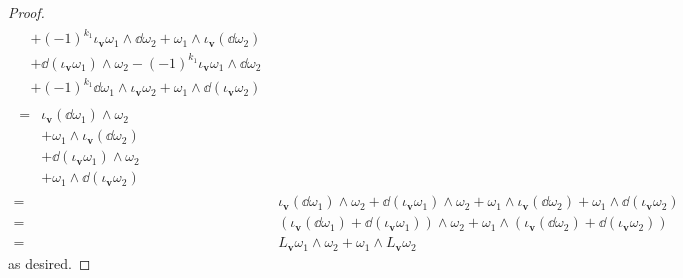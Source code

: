 \documentclass[../psets.tex]{subfiles}
\begin{document}
\begin{enumerate}[label={\textbf{2.5.\roman*.}}]
\begin{proof}
\begin{align*}
\begin{split}
                &+(-1)^{k_1}\iota_{\bm{v}}\omega_1\wedge\dd\omega_2+\omega_1\wedge\iota_{\bm{v}}(\dd\omega_2)\\
                &+\dd(\iota_{\bm{v}}\omega_1)\wedge\omega_2-(-1)^{k_1}\iota_{\bm{v}}\omega_1\wedge\dd\omega_2\\
                &+(-1)^{k_1}\dd\omega_1\wedge\iota_{\bm{v}}\omega_2+\omega_1\wedge\dd(\iota_{\bm{v}}\omega_2)
            \end{split}\\
            \begin{split}
                ={}& \iota_{\bm{v}}(\dd\omega_1)\wedge\omega_2\\
                &+\omega_1\wedge\iota_{\bm{v}}(\dd\omega_2)\\
                &+\dd(\iota_{\bm{v}}\omega_1)\wedge\omega_2\\
                &+\omega_1\wedge\dd(\iota_{\bm{v}}\omega_2)
            \end{split}\\
            ={}& \iota_{\bm{v}}(\dd\omega_1)\wedge\omega_2+\dd(\iota_{\bm{v}}\omega_1)\wedge\omega_2+\omega_1\wedge\iota_{\bm{v}}(\dd\omega_2)+\omega_1\wedge\dd(\iota_{\bm{v}}\omega_2)\\
            ={}& (\iota_{\bm{v}}(\dd\omega_1)+\dd(\iota_{\bm{v}}\omega_1))\wedge\omega_2+\omega_1\wedge(\iota_{\bm{v}}(\dd\omega_2)+\dd(\iota_{\bm{v}}\omega_2))\\
            ={}& L_{\bm{v}}\omega_1\wedge\omega_2+\omega_1\wedge L_{\bm{v}}\omega_2
        \end{align*}
        as desired.
    \end{proof}
\end{enumerate}
\end{document}
